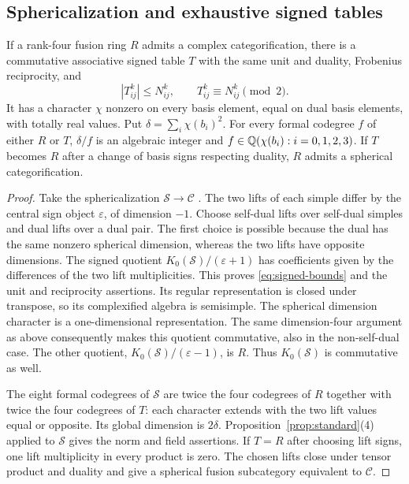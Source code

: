 \subsection{Sphericalization and exhaustive signed tables}
\begin{proposition}\label{prop:signed}
If a rank-four fusion ring $R$ admits a complex categorification, there
is a commutative associative signed table $T$ with the same unit and duality,
Frobenius reciprocity, and
\begin{equation}\label{eq:signed-bounds}
 |T_{ij}^k|\leq N_{ij}^k,\qquad T_{ij}^k\equiv N_{ij}^k\pmod2.
\end{equation}
It has a character $\chi$ nonzero on every basis element, equal on dual
basis elements, with totally real values. Put
$\delta=\sum_i\chi(b_i)^2$. For every formal codegree $f$ of either
$R$ or $T$, $\delta/f$ is an algebraic integer and
$f\in\mathbb Q(\chi(b_i):i=0,1,2,3)$.
If $T$ becomes $R$ after a change of basis signs respecting duality,
$R$ admits a spherical categorification.
\end{proposition}
\begin{proof}
Take the sphericalization $\mathcal S\to\mathcal C$
\cite[Section 5.1]{OstrikRank3}. The two lifts of each simple differ by the
central sign object $\varepsilon$, of dimension $-1$. Choose self-dual
lifts over self-dual simples and dual lifts over a dual pair. The first
choice is possible because the dual has the same nonzero spherical
dimension, whereas the two lifts have opposite dimensions. The signed
quotient $K_0(\mathcal S)/(\varepsilon+1)$ has coefficients given by the
differences of the two lift multiplicities. This proves
\eqref{eq:signed-bounds} and the unit and reciprocity assertions.
Its regular representation is closed under transpose, so its complexified
algebra is semisimple. The spherical dimension character is a
one-dimensional representation. The same dimension-four argument as
above consequently makes this quotient commutative, also in the
non-self-dual case. The other quotient,
$K_0(\mathcal S)/(\varepsilon-1)$, is $R$. Thus $K_0(\mathcal S)$ is
commutative as well.

The eight formal codegrees of $\mathcal S$ are twice the four codegrees
of $R$ together with twice the four codegrees of $T$: each character
extends with the two lift values equal or opposite. Its global dimension
is $2\delta$. Proposition~\ref{prop:standard}(4) applied to $\mathcal S$
gives the norm and field assertions. If $T=R$ after choosing lift signs,
one lift multiplicity in every product is zero. The chosen lifts close
under tensor product and duality and give a spherical fusion subcategory
equivalent to $\mathcal C$.
\end{proof}


